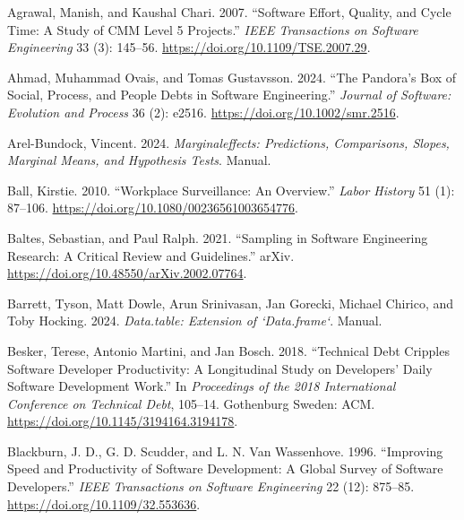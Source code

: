 \documentclass[
]{article}
\newlength{\cslhangindent}
\newenvironment{CSLReferences}[2] %
 {\begin{list}{}{%
  \setlength{\itemindent}{0pt}
  \setlength{\leftmargin}{0pt}
  \setlength{\parsep}{0pt}
  \ifodd #1
   \setlength{\leftmargin}{\cslhangindent}
   \setlength{\itemindent}{-1\cslhangindent}
  \fi
  \setlength{\itemsep}{#2\baselineskip}}}
 {\end{list}}
\begin{document}
\label{refs}
\begin{CSLReferences}{1}{0}
Agrawal, Manish, and Kaushal Chari. 2007. {``Software {Effort},
{Quality}, and {Cycle Time}: {A Study} of {CMM Level} 5 {Projects}.''}
\emph{IEEE Transactions on Software Engineering} 33 (3): 145--56.
\url{https://doi.org/10.1109/TSE.2007.29}.

Ahmad, Muhammad Ovais, and Tomas Gustavsson. 2024. {``The {Pandora}'s
Box of Social, Process, and People Debts in Software Engineering.''}
\emph{Journal of Software: Evolution and Process} 36 (2): e2516.
\url{https://doi.org/10.1002/smr.2516}.

Arel-Bundock, Vincent. 2024. \emph{Marginaleffects: {Predictions},
Comparisons, Slopes, Marginal Means, and Hypothesis Tests}. Manual.

Ball, Kirstie. 2010. {``Workplace Surveillance: An Overview.''}
\emph{Labor History} 51 (1): 87--106.
\url{https://doi.org/10.1080/00236561003654776}.

Baltes, Sebastian, and Paul Ralph. 2021. {``Sampling in {Software
Engineering Research}: {A Critical Review} and {Guidelines}.''} arXiv.
\url{https://doi.org/10.48550/arXiv.2002.07764}.

Barrett, Tyson, Matt Dowle, Arun Srinivasan, Jan Gorecki, Michael
Chirico, and Toby Hocking. 2024. \emph{Data.table: {Extension} of
`Data.frame`}. Manual.

Besker, Terese, Antonio Martini, and Jan Bosch. 2018. {``Technical Debt
Cripples Software Developer Productivity: A Longitudinal Study on
Developers' Daily Software Development Work.''} In \emph{Proceedings of
the 2018 {International Conference} on {Technical Debt}}, 105--14.
Gothenburg Sweden: ACM. \url{https://doi.org/10.1145/3194164.3194178}.

Blackburn, J. D., G. D. Scudder, and L. N. Van Wassenhove. 1996.
{``Improving Speed and Productivity of Software Development: A Global
Survey of Software Developers.''} \emph{IEEE Transactions on Software
Engineering} 22 (12): 875--85. \url{https://doi.org/10.1109/32.553636}.


\end{CSLReferences}
\end{document}
